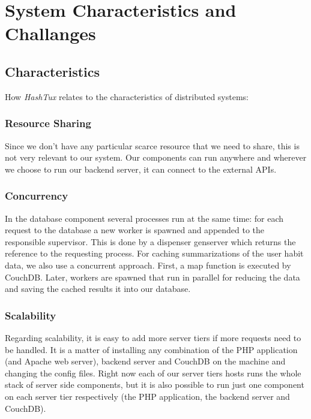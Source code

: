 \label{systemcharacteristics}
\chapter[System Characteristics and Challanges]
   {System Characteristics and\\ Challanges}

\section{Characteristics}
How \textit{HashTux} relates to the characteristics of distributed systems:

\subsection{Resource Sharing}
Since we don’t have any particular scarce resource that we need to share, this
is not very relevant to our system. Our components can run anywhere and wherever
we choose to run our backend server, it can connect to the external APIs.

\subsection{Concurrency}
In the database component several processes run at the same time: for each
request to the database a new worker is spawned and appended to the responsible
supervisor. This is done by a dispenser gen\textunderscore server which returns
the reference to the requesting process. \newline
For caching summarizations of the user habit data, we also use a concurrent
approach. First, a map function is executed by CouchDB. Later, workers are
spawned that run in parallel for reducing the data and saving the cached results
it into our database.

\subsection{Scalability}
Regarding scalability, it is easy to add more server tiers if more requests need
to be handled. It is a matter of installing any combination of the PHP
application (and Apache web server), backend server and CouchDB on the machine
and changing the config files. \newline
Right now each of our server tiers hosts runs the whole stack of server side
components, but it is also possible to run just one component on each server
tier respectively (the PHP application, the backend server and CouchDB).

